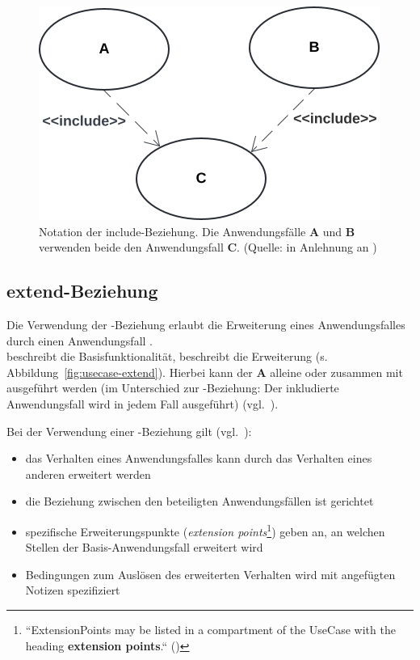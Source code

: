 \begin{figure}
    \centering
    \includegraphics[scale=0.4]{part three/Anwendungsfalldiagramm/img/usecase-include}
    \caption{Notation der include-Beziehung. Die Anwendungsfälle \textbf{A} und \textbf{B} verwenden beide den Anwendungsfall \textbf{C}. (Quelle: in Anlehnung an \cite[66, Abb. 2.8-5]{Bal05})}
    \label{fig:usecase-include}
\end{figure}


\subsection{extend-Beziehung}
Die Verwendung der -Beziehung erlaubt die Erweiterung eines Anwendungsfalles  durch einen Anwendungsfall .\\
 beschreibt die Basisfunktionalität,  beschreibt die Erweiterung (s. Abbildung~\ref{fig:usecase-extend}).
Hierbei kann der \textbf{A} alleine oder zusammen mit  ausgeführt werden (im Unterschied zur -Beziehung: Der inkludierte Anwendungsfall wird in jedem Fall ausgeführt) (vgl.~\cite[54]{Bal05}).

\noindent
Bei der Verwendung einer -Beziehung gilt (vgl.~\cite[53]{Buh09}):

\begin{itemize}
    \item das Verhalten eines Anwendungsfalles kann durch das Verhalten eines anderen erweitert werden
    \item die Beziehung zwischen den beteiligten Anwendungsfällen ist gerichtet
    \item spezifische Erweiterungspunkte (\textit{extension points}\footnote{
        ``ExtensionPoints may be listed in a compartment of the UseCase with the heading \textbf{extension points}.`` (\cite[642, Hervorhebung i.O.]{OMG17})
    }) geben an, an welchen Stellen der Basis-Anwendungsfall erweitert wird
    \item Bedingungen zum Auslösen des erweiterten Verhalten wird mit angefügten Notizen spezifiziert
\end{itemize}

